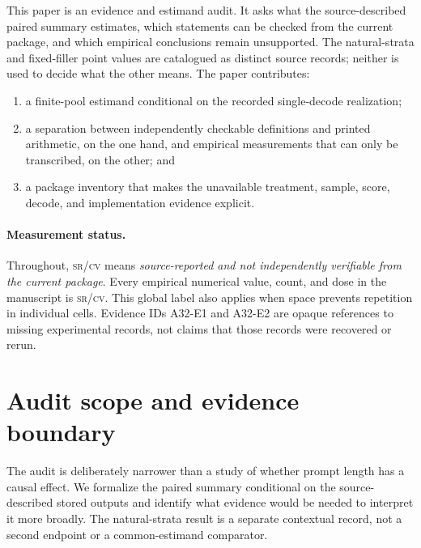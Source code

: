 \documentclass{article}
\newcommand{\srcv}{\textsc{sr/cv}}
\begin{document}
This paper is an evidence and estimand audit.  It asks what the source-described paired
summary estimates, which statements can be checked from the current package, and which
empirical conclusions remain unsupported.  The natural-strata and fixed-filler point
values are catalogued as distinct source records; neither is used to decide what the
other means.  The paper contributes:

\begin{enumerate}
\item a finite-pool estimand conditional on the recorded single-decode realization;
\item a separation between independently checkable definitions and printed arithmetic,
on the one hand, and empirical measurements that can only be transcribed, on the other;
and
\item a package inventory that makes the unavailable treatment, sample, score, decode,
and implementation evidence explicit.
\end{enumerate}

\paragraph{Measurement status.}
Throughout, \srcv{} means \emph{source-reported and not independently verifiable from
the current package}.  Every empirical numerical value, count, and dose in the
manuscript is \srcv{}.  This global label also applies when space prevents repetition
in individual cells.  Evidence IDs A32-E1 and A32-E2 are opaque references to missing
experimental records, not claims that those records were recovered or rerun.

\section{Audit scope and evidence boundary}
\label{sec:question}

The audit is deliberately narrower than a study of whether prompt length has a causal
effect.  We formalize the paired summary conditional on the source-described stored
outputs and identify what evidence would be needed to interpret it more broadly.  The
natural-strata result is a separate contextual record, not a second endpoint or a
common-estimand comparator.
\end{document}
